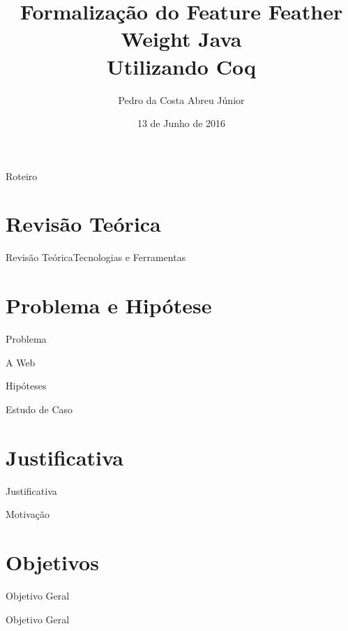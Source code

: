 \documentclass{beamer}
\title[Formalização do FFJ em Coq]{Formalização do Feature Feather Weight Java \\ Utilizando Coq}
\author{Pedro da Costa Abreu Júnior}
\institute[UnB] %
{
	Departmento de Ciência da Computação\\
	Universidade de Brasília 
}
\date{13 de Junho de 2016}
\begin{document}
	
	\begin{frame}
		\titlepage
	\end{frame}
	
	\begin{frame}{Roteiro}
		\tableofcontents
	\end{frame}
	
	\section{Revisão Teórica}
	
	
	\begin{frame}{Revisão Teórica}{Tecnologias e Ferramentas}

	\end{frame}
	
	\section{Problema e Hipótese}
	\begin{frame}{Problema}
		\begin{block}{A Web}
			
		\end{block}
	\end{frame}
	
	\begin{frame}{Hipóteses}
		\begin{block}{Estudo de Caso}
		\end{block}
	\end{frame}
	
	\section{Justificativa}
	
	\begin{frame}{Justificativa}
		\begin{block}{Motivação}
		\end{block}    
	\end{frame}
	
	
	\section{Objetivos}
	
	\begin{frame}{Objetivo Geral}
		\begin{block}{Objetivo Geral}
		\end{block}
	\end{frame}
	
\end{document}
